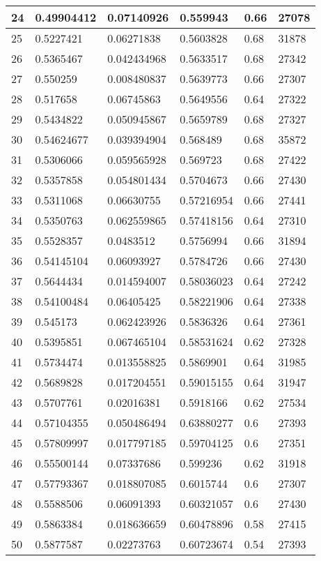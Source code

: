 \begin{longtable}{|l|l|l|l|l|l|}
24 & 0.49904412 & 0.07140926 & 0.559943 & 0.66 & 27078 \\ \hline 
25 & 0.5227421 & 0.06271838 & 0.5603828 & 0.68 & 31878 \\ \hline 
26 & 0.5365467 & 0.042434968 & 0.5633517 & 0.68 & 27342 \\ \hline 
27 & 0.550259 & 0.008480837 & 0.5639773 & 0.66 & 27307 \\ \hline 
28 & 0.517658 & 0.06745863 & 0.5649556 & 0.64 & 27322 \\ \hline 
29 & 0.5434822 & 0.050945867 & 0.5659789 & 0.68 & 27327 \\ \hline 
30 & 0.54624677 & 0.039394904 & 0.568489 & 0.68 & 35872 \\ \hline 
31 & 0.5306066 & 0.059565928 & 0.569723 & 0.68 & 27422 \\ \hline 
32 & 0.5357858 & 0.054801434 & 0.5704673 & 0.66 & 27430 \\ \hline 
33 & 0.5311068 & 0.06630755 & 0.57216954 & 0.66 & 27441 \\ \hline 
34 & 0.5350763 & 0.062559865 & 0.57418156 & 0.64 & 27310 \\ \hline 
35 & 0.5528357 & 0.0483512 & 0.5756994 & 0.66 & 31894 \\ \hline 
36 & 0.54145104 & 0.06093927 & 0.5784726 & 0.66 & 27430 \\ \hline 
37 & 0.5644434 & 0.014594007 & 0.58036023 & 0.64 & 27242 \\ \hline 
38 & 0.54100484 & 0.06405425 & 0.58221906 & 0.64 & 27338 \\ \hline 
39 & 0.545173 & 0.062423926 & 0.5836326 & 0.64 & 27361 \\ \hline 
40 & 0.5395851 & 0.067465104 & 0.58531624 & 0.62 & 27328 \\ \hline 
41 & 0.5734474 & 0.013558825 & 0.5869901 & 0.64 & 31985 \\ \hline 
42 & 0.5689828 & 0.017204551 & 0.59015155 & 0.64 & 31947 \\ \hline 
43 & 0.5707761 & 0.02016381 & 0.5918166 & 0.62 & 27534 \\ \hline 
44 & 0.57104355 & 0.050486494 & 0.63880277 & 0.6 & 27393 \\ \hline 
45 & 0.57809997 & 0.017797185 & 0.59704125 & 0.6 & 27351 \\ \hline 
46 & 0.55500144 & 0.07337686 & 0.599236 & 0.62 & 31918 \\ \hline 
47 & 0.57793367 & 0.018807085 & 0.6015744 & 0.6 & 27307 \\ \hline 
48 & 0.5588506 & 0.06091393 & 0.60321057 & 0.6 & 27430 \\ \hline 
49 & 0.5863384 & 0.018636659 & 0.60478896 & 0.58 & 27415 \\ \hline 
50 & 0.5877587 & 0.02273763 & 0.60723674 & 0.54 & 27393 \\ \hline 
\end{longtable}